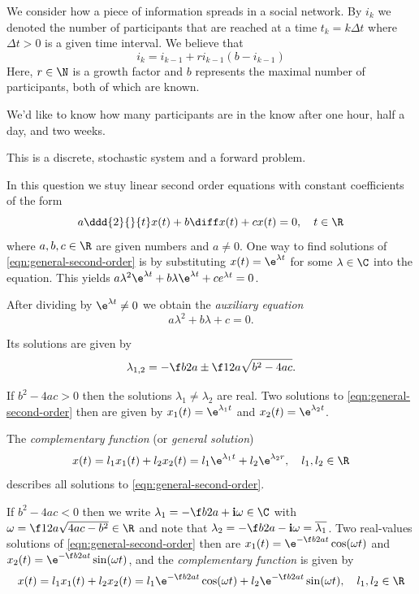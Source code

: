 \documentclass[a4paper]{article}
\begin{document}
\begin{questionbody}
We consider how a piece of information spreads in a social network. By $i_k$ we denoted the number of participants that are reached at a time $t_k = k \Delta t$ where $\Delta t > 0$ is a given time interval. We believe that \[
i_k = i_{k-1} + r i_{k-1} (b - i_{k-1})
\]
Here, $r \in \N$ is a growth factor and $b$ represents the maximal number of participants, both of which are known.

We'd like to know how many participants are in the know after one hour, half a day, and two weeks.
\end{questionbody}

This is a discrete, stochastic system and a forward problem.



\begin{questionbody}
In this question we stuy linear second order equations with constant coefficients of the form \begin{equation}
a \ddd{2}{}{t} x(t) + b \diff x(t) + c x(t) = 0, \quad t \in \R
\label{eqn:general-second-order}
\end{equation}
where $a, b, c \in \R$ are given numbers and $a \ne 0$. One way to find solutions of \eqref{eqn:general-second-order} is by substituting $x(t) = \e^{\lambda t}$ for some $\lambda \in \C$ into the equation. This yields $a \lambda^2 \e^{\lambda t} + b \lambda \e^{\lambda t} + c e^{\lambda t} = 0$.

After dividing by $\e^{\lambda t} \ne 0$ we obtain the \textit{auxiliary equation} \[
a \lambda^2 + b \lambda + c = 0.
\]

Its solutions are given by \[
\lambda_{1,2} = -\f b{2a} \pm \f 1{2a} \sqrt{b^2 - 4ac}.
\]

If $b^2 - 4ac > 0$ then the solutions $\lambda_1 \ne \lambda_2$ are real. Two solutions to \eqref{eqn:general-second-order} then are given by $x_1(t) = \e^{\lambda_1 t}$ and $x_2(t) = \e^{\lambda_2 t}$.

The \textit{complementary function} (or \textit{general solution}) \[
x(t) = l_1 x_1(t) + l_2 x_2(t) = l_1 \e^{\lambda_1 t} + l_2 \e^{\lambda_2 r}, \quad l_1, l_2 \in \R
\] describes all solutions to \eqref{eqn:general-second-order}.

If $b^2 - 4ac < 0$ then we write $\lambda_1 = -\f b{2a} + \mathbf{i} \omega \in \C$ with $\omega = \f 1{2a} \sqrt{4ac - b^2} \in \R$ and note that $\lambda_2 = -\f b{2a} - \mathbf{i} \omega = \overline{\lambda_1}$.
Two real-values solutions of \eqref{eqn:general-second-order} then are $x_1(t) = \e^{-\f b{2a} t} \cos(\omega t)$ and $x_2(t) = \e^{-\f b{2a} t} \sin(\omega t)$, and the \textit{complementary function} is given by \[
x(t) = l_1 x_1(t) + l_2 x_2(t) = l_1 \e^{-\f b{2a} t} \cos(\omega t) + l_2 \e^{-\f b{2a} t} \sin(\omega t), \quad l_1, l_2 \in \R
\]
\end{questionbody}
\end{document}
